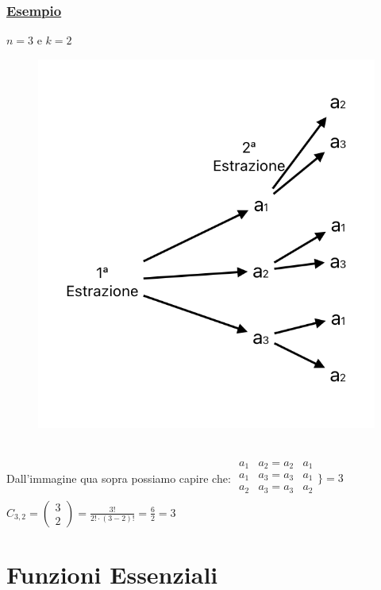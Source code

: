 \documentclass{article}
\begin{document}
\subsubsection{\underline{Esempio}}
$n=3$ e $k=2$ \\
\begin{figure}[h]
\centering
\includegraphics[scale=0.5]{5.Comb.png}
\end{figure} \\
Dall'immagine qua sopra possiamo capire che: $\begin{matrix}
a_1 & a_2 = a_2 & a_1 \\
a_1 & a_3 = a_3 & a_1 \\
a_2 & a_3 = a_3 & a_2 \\
\end{matrix} 
\Biggr\}
=3$ \\
$C_{3,2} = \left( \begin{matrix} 3 \\ 2 \end{matrix} \right) =  \frac{3!}{2! \cdot (3-2)!} = \frac{6}{2} = 3$
\section{Funzioni Essenziali}
\end{document}
